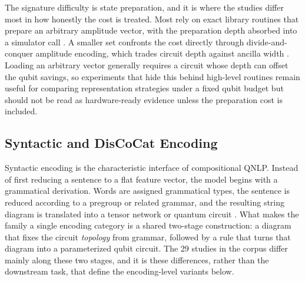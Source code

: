 \documentclass{ieeeaccess}
\begin{document}
The signature difficulty is state preparation, and it is where the studies differ most in how honestly the cost is treated. Most rely on exact library routines that prepare an arbitrary amplitude vector, with the preparation depth absorbed into a simulator call \cite{buonaiuto_quantum_2024,guarasci_applying_2025}. A smaller set confronts the cost directly through divide-and-conquer amplitude encoding, which trades circuit depth against ancilla width \cite{zhang_entangled_2024}. Loading an arbitrary vector generally requires a circuit whose depth can offset the qubit savings, so experiments that hide this behind high-level routines remain useful for comparing representation strategies under a fixed qubit budget but should not be read as hardware-ready evidence unless the preparation cost is included.

\subsection{Syntactic and DisCoCat Encoding}
\label{subsec:syntactic_encoding}

Syntactic encoding is the characteristic interface of compositional QNLP. Instead of first reducing a sentence to a flat feature vector, the model begins with a grammatical derivation. Words are assigned grammatical types, the sentence is reduced according to a pregroup or related grammar, and the resulting string diagram is translated into a tensor network or quantum circuit \cite{coecke2010mathematical}. What makes the family a single encoding category is a shared two-stage construction: a diagram that fixes the circuit \emph{topology} from grammar, followed by a rule that turns that diagram into a parameterized qubit circuit. The 29 studies in the corpus differ mainly along these two stages, and it is these differences, rather than the downstream task, that define the encoding-level variants below.
\end{document}
